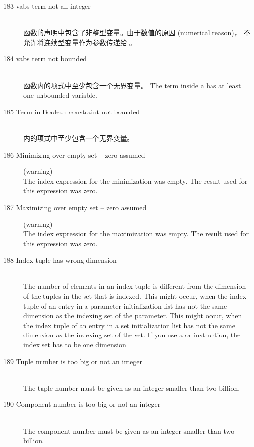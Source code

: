 \begin{description}
\item[183 vabs term not all integer]\ \\
   函数的声明中包含了非整型变量。由于数值的原因 (numerical reason)，
  不允许将连续型变量作为参数传递给 。
\item[184 vabs term not bounded]\ \\
   函数内的项式中至少包含一个无界变量。
   The term inside a  has at least one unbounded variable.
\item[185 Term in Boolean constraint not bounded]\ \\
   内的项式中至少包含一个无界变量。
%
%
\item[186 Minimizing over empty set -- zero assumed] (warning)\ \\
   The index expression for the minimization was empty. The result
   used for this expression was zero.
\item[187 Maximizing over empty set -- zero assumed] (warning)\ \\
   The index expression for the maximization was empty. The result
   used for this expression was zero.
\item[188 Index tuple has wrong dimension]\ \\
   The number of elements in an index tuple is different from the
   dimension of the tuples in the set that is indexed.
   This might occur, when the index tuple of an entry in a parameter initialization list has
   not the same dimension as the indexing set of the parameter. 
   This might occur, when the index tuple of an entry in a set
   initialization list has
   not the same dimension as the indexing set of the set. 
   If you use a  or  instruction, the index
   set has to be one dimension.
\item[189 Tuple number  is too big or not an integer]\ \\
  The tuple number must be given as an integer smaller than two
  billion.
\item[190 Component number  is too big or not an integer]\ \\
  The component number must be given as an integer smaller than two
  billion.

\end{description}
